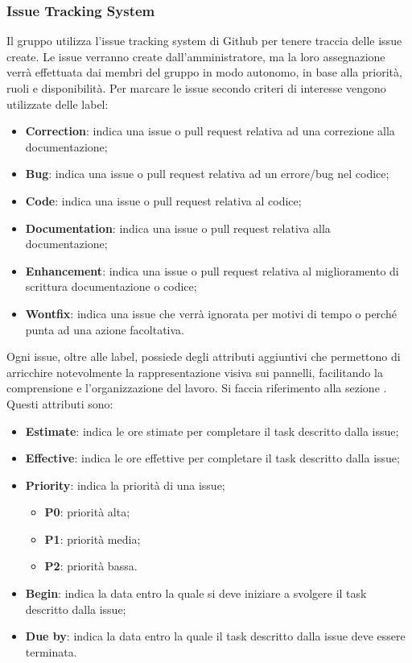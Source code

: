 \subsubsection{Issue Tracking System}\label{inf:its}
Il gruppo utilizza l'issue tracking system di Github per tenere traccia delle
issue create. Le issue verranno create dall'amministratore, ma la loro
assegnazione verrà effettuata dai membri del gruppo in modo autonomo, in base
alla priorità, ruoli e disponibilità. Per marcare le issue secondo criteri di
interesse vengono utilizzate delle label:
\begin{itemize}
    \item \textbf{Correction}: indica una issue o pull request relativa ad una correzione alla documentazione;
    \item \textbf{Bug}: indica una issue o pull request relativa ad un errore/bug nel codice;
    \item \textbf{Code}: indica una issue o pull request relativa al codice;
    \item \textbf{Documentation}: indica una issue o pull request relativa alla documentazione;
    \item \textbf{Enhancement}: indica una issue o pull request relativa al miglioramento di scrittura documentazione o codice;
    \item \textbf{Wontfix}: indica una issue che verrà ignorata per motivi di tempo o perché punta ad una azione facoltativa.
\end{itemize}
Ogni issue, oltre alle label, possiede degli attributi aggiuntivi che permettono di arricchire
notevolmente la rappresentazione visiva sui pannelli, facilitando la comprensione e l'organizzazione del lavoro.
Si faccia riferimento alla sezione .
Questi attributi sono:
\begin{itemize}
    \item \textbf{Estimate}: indica le ore stimate per completare il task descritto dalla issue;
    \item \textbf{Effective}: indica le ore effettive per completare il task descritto dalla issue;
    \item \textbf{Priority}: indica la priorità di una issue;
          \begin{itemize}
              \item \textbf{P0}: priorità alta;
              \item \textbf{P1}: priorità media;
              \item \textbf{P2}: priorità bassa.
          \end{itemize}
    \item \textbf{Begin}: indica la data entro la quale si deve iniziare a svolgere il task descritto dalla issue;
    \item \textbf{Due by}: indica la data entro la quale il task descritto dalla issue deve essere terminata.
\end{itemize}

